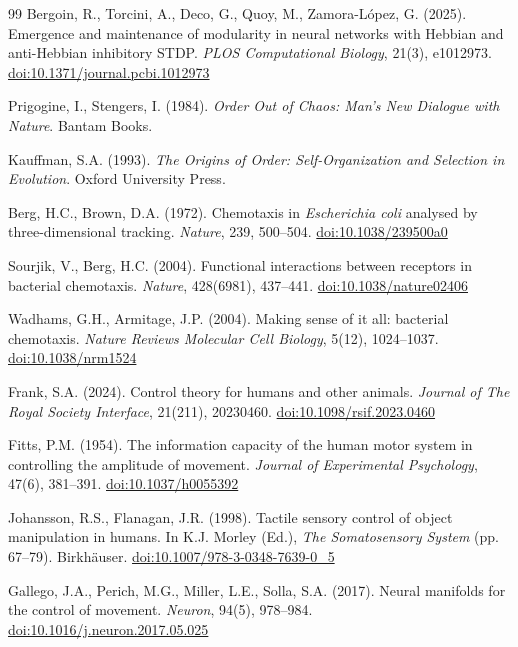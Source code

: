 \documentclass[12pt]{article}
\begin{document}
\begin{thebibliography}{99}
Bergoin, R., Torcini, A., Deco, G., Quoy, M., Zamora-López, G. (2025). Emergence and maintenance of modularity in neural networks with Hebbian and anti-Hebbian inhibitory STDP. \textit{PLOS Computational Biology}, 21(3), e1012973. \href{https://doi.org/10.1371/journal.pcbi.1012973}{doi:10.1371/journal.pcbi.1012973}

Prigogine, I., Stengers, I. (1984). \textit{Order Out of Chaos: Man's New Dialogue with Nature}. Bantam Books.

Kauffman, S.A. (1993). \textit{The Origins of Order: Self-Organization and Selection in Evolution}. Oxford University Press.

Berg, H.C., Brown, D.A. (1972). Chemotaxis in \textit{Escherichia coli} analysed by three-dimensional tracking. \textit{Nature}, 239, 500--504. \href{https://doi.org/10.1038/239500a0}{doi:10.1038/239500a0}

Sourjik, V., Berg, H.C. (2004). Functional interactions between receptors in bacterial chemotaxis. \textit{Nature}, 428(6981), 437--441. \href{https://doi.org/10.1038/nature02406}{doi:10.1038/nature02406}

Wadhams, G.H., Armitage, J.P. (2004). Making sense of it all: bacterial chemotaxis. \textit{Nature Reviews Molecular Cell Biology}, 5(12), 1024--1037. \href{https://doi.org/10.1038/nrm1524}{doi:10.1038/nrm1524}

Frank, S.A. (2024). Control theory for humans and other animals. \textit{Journal of The Royal Society Interface}, 21(211), 20230460. \href{https://doi.org/10.1098/rsif.2023.0460}{doi:10.1098/rsif.2023.0460}

Fitts, P.M. (1954). The information capacity of the human motor system in controlling the amplitude of movement. \textit{Journal of Experimental Psychology}, 47(6), 381--391. \href{https://doi.org/10.1037/h0055392}{doi:10.1037/h0055392}

Johansson, R.S., Flanagan, J.R. (1998). Tactile sensory control of object manipulation in humans. In K.J. Morley (Ed.), \textit{The Somatosensory System} (pp. 67--79). Birkhäuser. \href{https://doi.org/10.1007/978-3-0348-7639-0_5}{doi:10.1007/978-3-0348-7639-0\_5}

Gallego, J.A., Perich, M.G., Miller, L.E., Solla, S.A. (2017). Neural manifolds for the control of movement. \textit{Neuron}, 94(5), 978--984. \href{https://doi.org/10.1016/j.neuron.2017.05.025}{doi:10.1016/j.neuron.2017.05.025}


\end{thebibliography}
\end{document}
